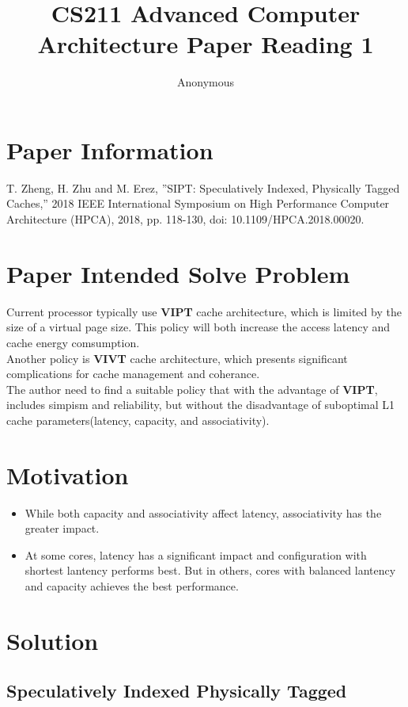 \documentclass[10pt,a4paper]{article}
\begin{document}
\title{CS211 Advanced Computer Architecture Paper Reading 1}
\author{Anonymous}
\date{}
\maketitle



\section{Paper Information}
T. Zheng, H. Zhu and M. Erez, ”SIPT: Speculatively Indexed, Physically Tagged Caches,” 2018 IEEE International Symposium on High Performance Computer Architecture (HPCA), 2018, pp. 118-130, doi: 10.1109/HPCA.2018.00020.

\section{Paper Intended Solve Problem}
Current processor typically use \textbf{VIPT} cache architecture, which is limited by the size of a virtual page size. This policy will both increase the access latency and cache energy comsumption.\\
Another policy is \textbf{VIVT} cache architecture, which presents significant complications for cache management and coherance.\\
The author need to find a suitable policy that with the advantage of \textbf{VIPT}, includes simpism and reliability, but without the disadvantage of suboptimal L1 cache parameters(latency, capacity, and associativity).

\section{Motivation}
\begin{itemize}
    \item While both capacity and associativity affect latency, associativity has the greater impact. 
    \item At some cores, latency has a significant impact and configuration with shortest lantency performs best. But in others, cores with balanced lantency and capacity achieves the best performance.
\end{itemize}

\section{Solution}
\subsection{Speculatively Indexed Physically Tagged}
\end{document}
